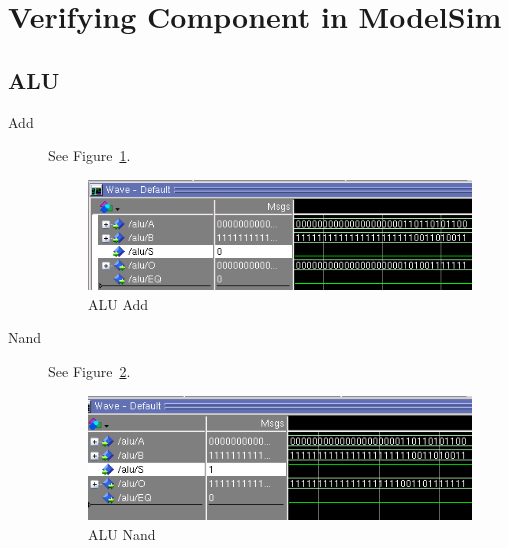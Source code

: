 \documentclass[a4paper]{article}
\begin{document}
\section{Verifying Component in ModelSim}
\subsection{ALU}
\begin{description}
    \item[Add] See Figure~\ref{fig:alu_add}.

        \begin{figure}[ht!]
            \center
            \includegraphics[scale=0.6]{alu_add}
            \caption{ALU Add}\label{fig:alu_add}
        \end{figure}

    \item[Nand] See Figure~\ref{fig:alu_nand}.

        \begin{figure}[ht!]
            \center
            \includegraphics[scale=0.6]{alu_nand}
            \caption{ALU Nand}\label{fig:alu_nand}
        \end{figure}
\end{description}
\end{document}
